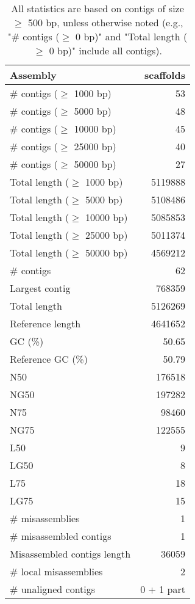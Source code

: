 \documentclass[12pt,a4paper]{article}
\begin{document}
\begin{table}[ht]
\begin{center}
\caption{All statistics are based on contigs of size $\geq$ 500 bp, unless otherwise noted (e.g., "\# contigs ($\geq$ 0 bp)" and "Total length ($\geq$ 0 bp)" include all contigs).}
\begin{tabular}{|l*{1}{|r}|}
\hline
Assembly & scaffolds \\ \hline
\# contigs ($\geq$ 1000 bp) & 53 \\ \hline
\# contigs ($\geq$ 5000 bp) & 48 \\ \hline
\# contigs ($\geq$ 10000 bp) & 45 \\ \hline
\# contigs ($\geq$ 25000 bp) & 40 \\ \hline
\# contigs ($\geq$ 50000 bp) & 27 \\ \hline
Total length ($\geq$ 1000 bp) & 5119888 \\ \hline
Total length ($\geq$ 5000 bp) & 5108486 \\ \hline
Total length ($\geq$ 10000 bp) & 5085853 \\ \hline
Total length ($\geq$ 25000 bp) & 5011374 \\ \hline
Total length ($\geq$ 50000 bp) & 4569212 \\ \hline
\# contigs & 62 \\ \hline
Largest contig & 768359 \\ \hline
Total length & 5126269 \\ \hline
Reference length & 4641652 \\ \hline
GC (\%) & 50.65 \\ \hline
Reference GC (\%) & 50.79 \\ \hline
N50 & 176518 \\ \hline
NG50 & 197282 \\ \hline
N75 & 98460 \\ \hline
NG75 & 122555 \\ \hline
L50 & 9 \\ \hline
LG50 & 8 \\ \hline
L75 & 18 \\ \hline
LG75 & 15 \\ \hline
\# misassemblies & 1 \\ \hline
\# misassembled contigs & 1 \\ \hline
Misassembled contigs length & 36059 \\ \hline
\# local misassemblies & 2 \\ \hline
\# unaligned contigs & 0 + 1 part \\ \hline

\end{tabular}
\end{center}
\end{table}
\end{document}
